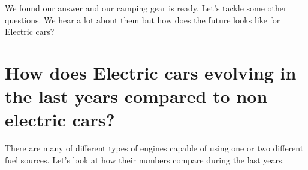 \documentclass[]{article}
\newenvironment{Shaded}{\begin{snugshade}}{\end{snugshade}}
\newcommand{\CharTok}[1]{\textcolor[rgb]{0.31,0.60,0.02}{#1}}
\newcommand{\CommentTok}[1]{\textcolor[rgb]{0.56,0.35,0.01}{\textit{#1}}}
\newcommand{\DataTypeTok}[1]{\textcolor[rgb]{0.13,0.29,0.53}{#1}}
\newcommand{\DecValTok}[1]{\textcolor[rgb]{0.00,0.00,0.81}{#1}}
\newcommand{\KeywordTok}[1]{\textcolor[rgb]{0.13,0.29,0.53}{\textbf{#1}}}
\newcommand{\NormalTok}[1]{#1}
\newcommand{\OperatorTok}[1]{\textcolor[rgb]{0.81,0.36,0.00}{\textbf{#1}}}
\newcommand{\OtherTok}[1]{\textcolor[rgb]{0.56,0.35,0.01}{#1}}
\newcommand{\StringTok}[1]{\textcolor[rgb]{0.31,0.60,0.02}{#1}}
\begin{document}
We found our answer and our camping gear is ready. Let's tackle some
other questions. We hear a lot about them but how does the future looks
like for Electric cars?

\hypertarget{how-does-electric-cars-evolving-in-the-last-years-compared-to-non-electric-cars}{%
\section{How does Electric cars evolving in the last years compared to
non electric
cars?}\label{how-does-electric-cars-evolving-in-the-last-years-compared-to-non-electric-cars}}

There are many of different types of engines capable of using one or two
different fuel sources. Let's look at how their numbers compare during
the last years.

\begin{Shaded}
\end{Shaded}
\end{document}

